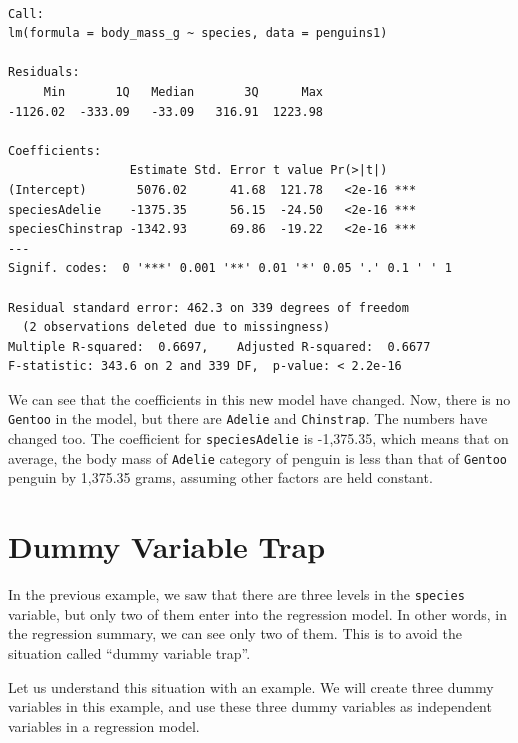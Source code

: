\documentclass[
  letterpaper,
  paper =a4,
  twoside,
  openright,
  headsepline,
  footsepline,
  listof = totocnumbered,
  chapterprefix = true,
  firstiscover,
  parskip = full*]{scrbook}
\begin{document}
\begin{verbatim}

Call:
lm(formula = body_mass_g ~ species, data = penguins1)

Residuals:
     Min       1Q   Median       3Q      Max 
-1126.02  -333.09   -33.09   316.91  1223.98 

Coefficients:
                 Estimate Std. Error t value Pr(>|t|)    
(Intercept)       5076.02      41.68  121.78   <2e-16 ***
speciesAdelie    -1375.35      56.15  -24.50   <2e-16 ***
speciesChinstrap -1342.93      69.86  -19.22   <2e-16 ***
---
Signif. codes:  0 '***' 0.001 '**' 0.01 '*' 0.05 '.' 0.1 ' ' 1

Residual standard error: 462.3 on 339 degrees of freedom
  (2 observations deleted due to missingness)
Multiple R-squared:  0.6697,    Adjusted R-squared:  0.6677 
F-statistic: 343.6 on 2 and 339 DF,  p-value: < 2.2e-16
\end{verbatim}

We can see that the coefficients in this new model have changed. Now,
there is no \texttt{Gentoo} in the model, but there are \texttt{Adelie}
and \texttt{Chinstrap}. The numbers have changed too. The coefficient
for \texttt{speciesAdelie} is -1,375.35, which means that on average,
the body mass of \texttt{Adelie} category of penguin is less than that
of \texttt{Gentoo} penguin by 1,375.35 grams, assuming other factors are
held constant.

\section{Dummy Variable Trap}\label{dummy-variable-trap}

In the previous example, we saw that there are three levels in the
\texttt{species} variable, but only two of them enter into the
regression model. In other words, in the regression summary, we can see
only two of them. This is to avoid the situation called ``dummy variable
trap''.

Let us understand this situation with an example. We will create three
dummy variables in this example, and use these three dummy variables as
independent variables in a regression model.
\end{document}
